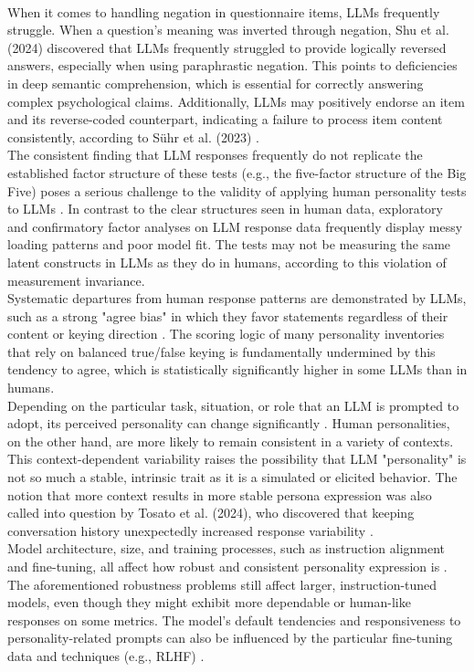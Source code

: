\documentclass{DESSThesis}
\begin{document}
\\
When it comes to handling negation in questionnaire items, LLMs frequently struggle. When a question's meaning was inverted through negation, Shu et al. (2024) discovered that LLMs frequently struggled to provide logically reversed answers, especially when using paraphrastic negation. This points to deficiencies in deep semantic comprehension, which is essential for correctly answering complex psychological claims. Additionally, LLMs may positively endorse an item and its reverse-coded counterpart, indicating a failure to process item content consistently, according to Sühr et al. (2023) \cite{suhr_challenging_2023}.
\\
The consistent finding that LLM responses frequently do not replicate the established factor structure of these tests (e.g., the five-factor structure of the Big Five) poses a serious challenge to the validity of applying human personality tests to LLMs \cite{suhr_challenging_2023}. In contrast to the clear structures seen in human data, exploratory and confirmatory factor analyses on LLM response data frequently display messy loading patterns and poor model fit. The tests may not be measuring the same latent constructs in LLMs as they do in humans, according to this violation of measurement invariance.
\\
Systematic departures from human response patterns are demonstrated by LLMs, such as a strong "agree bias" in which they favor statements regardless of their content or keying direction \cite{suhr_challenging_2023}. The scoring logic of many personality inventories that rely on balanced true/false keying is fundamentally undermined by this tendency to agree, which is statistically significantly higher in some LLMs than in humans.
\\
Depending on the particular task, situation, or role that an LLM is prompted to adopt, its perceived personality can change significantly \cite{chang_language_2023,tommaso_llms_2024}. Human personalities, on the other hand, are more likely to remain consistent in a variety of contexts. This context-dependent variability raises the possibility that LLM "personality" is not so much a stable, intrinsic trait as it is a simulated or elicited behavior. The notion that more context results in more stable persona expression was also called into question by Tosato et al. (2024), who discovered that keeping conversation history unexpectedly increased response variability \cite{tommaso_llms_2024}.
\\
Model architecture, size, and training processes, such as instruction alignment and fine-tuning, all affect how robust and consistent personality expression is \cite{bodroza_personality_2024,hilliard_eliciting_2024,safdari_personality_2023,lee_llms_2024}. The aforementioned robustness problems still affect larger, instruction-tuned models, even though they might exhibit more dependable or human-like responses on some metrics. The model's default tendencies and responsiveness to personality-related prompts can also be influenced by the particular fine-tuning data and techniques (e.g., RLHF) \cite{bodroza_personality_2024}.
\end{document}
